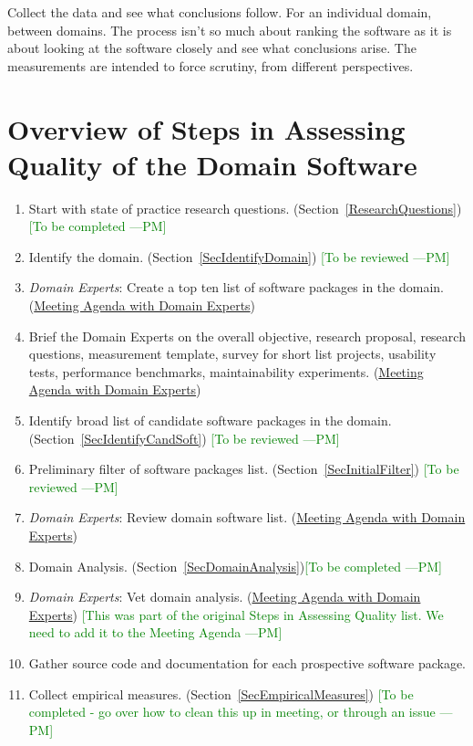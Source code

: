 \documentclass[letterpaper,cleveref]{lipics-v2019}
\newcommand{\authornote}[3]{\textcolor{#1}{[#3 ---#2]}}
\newcommand{\authornote}[3]{}
\newcommand{\pmi}[1]{\authornote{green}{PM}{#1}} %
\theoremstyle{definition}
\begin{document}
Collect the data and see what conclusions follow.  For an individual domain,
between domains.  The process isn't so much about ranking the software as it is
about looking at the software closely and see what conclusions arise.  The
measurements are intended to force scrutiny, from different perspectives.

\section{Overview of Steps in Assessing Quality of the Domain Software}

\begin{enumerate}
\item Start with state of practice research questions. (Section~\ref{ResearchQuestions}) \pmi{To be completed}
\item Identify the domain. (Section~\ref{SecIdentifyDomain}) \pmi{To be reviewed}
\item \emph{Domain Experts}: Create a top ten list of software packages in the domain. (\href{run:Meeting Agenda with Domain Experts.pdf}{Meeting Agenda with Domain Experts})
\item Brief the Domain Experts on the overall objective, research proposal, research questions, measurement template, survey for short list projects, usability tests, performance benchmarks, maintainability experiments. (\href{run:Meeting Agenda with Domain Experts.pdf}{Meeting Agenda with Domain Experts})
\item Identify broad list of candidate software packages in the domain. (Section~\ref{SecIdentifyCandSoft}) \pmi{To be reviewed}
\item Preliminary filter of software packages list. (Section~\ref{SecInitialFilter}) \pmi{To be reviewed}
\item \emph{Domain Experts}: Review domain software list. (\href{run:Meeting Agenda with Domain Experts.pdf}{Meeting Agenda with Domain Experts})
\item Domain Analysis. (Section~\ref{SecDomainAnalysis})\pmi{To be completed}
\item \emph{Domain Experts}: Vet domain analysis. (\href{run:Meeting Agenda with Domain Experts.pdf}{Meeting Agenda with Domain Experts}) \pmi{This was part of the original Steps in Assessing Quality list. We need to add it to the Meeting Agenda}
\item Gather source code and documentation for each prospective software package.
\item Collect empirical measures. (Section~\ref{SecEmpiricalMeasures}) \pmi{To be completed - go over how to clean this up in meeting, or through an issue}

\end{enumerate}
\end{document}
